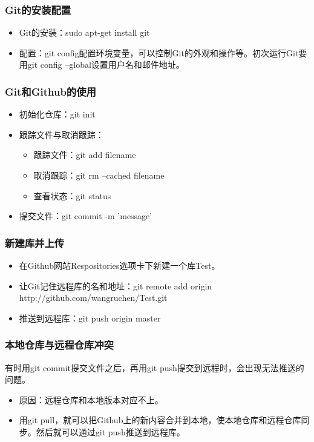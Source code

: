 \documentclass[notheorems,mathserif,table,compress]{beamer}  %
\begin{document}
\begin{frame}
\frametitle{Git的安装配置}
\begin{itemize}
\item Git的安装：sudo apt-get install git
\item 配置：git config配置环境变量，可以控制Git的外观和操作等。初次运行Git要用git config --global设置用户名和邮件地址。
\end{itemize}

\end{frame}


\begin{frame}
  \frametitle{Git和Github的使用}
\begin{itemize}
\item 初始化仓库：git init
\item 跟踪文件与取消跟踪：
	\begin{itemize}
	\item 跟踪文件：git add filename
	\item 取消跟踪：git rm --cached filename
	\item 查看状态：git status
	\end{itemize}
\item 提交文件：git commit -m 'message'
\end{itemize}
\end{frame}

\begin{frame}
  \frametitle{新建库并上传}
\begin{itemize}
\item 在Github网站Respositories选项卡下新建一个库Test。
\item 让Git记住远程库的名和地址：git remote add origin http://github.com/wangruchen/Test.git
\item 推送到远程库：git push origin master
\end{itemize}   
\end{frame}

\begin{frame}
  \frametitle{本地仓库与远程仓库冲突}
有时用git commit提交文件之后，再用git push提交到远程时，会出现无法推送的问题。\\
\begin{itemize}
\item 原因：远程仓库和本地版本对应不上。
\item 用git pull，就可以把Github上的新内容合并到本地，使本地仓库和远程仓库同步。然后就可以通过git push推送到远程库。
\end{itemize}       
\end{frame}
\end{document}
